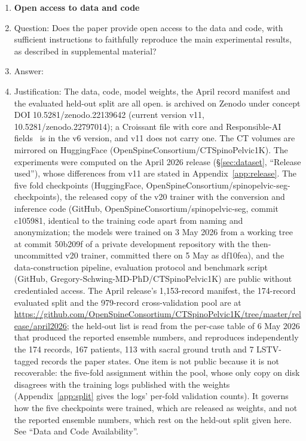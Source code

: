 \begin{enumerate}
\item {\bf Open access to data and code}
    \item[] Question: Does the paper provide open access to the data and code, with sufficient instructions to faithfully reproduce the main experimental results, as described in supplemental material?
    \item[] Answer: \answerYes{}
    \item[] Justification: The data, code, model weights, the April record manifest and the evaluated held-out split are all open. \dataset{} is archived on Zenodo under concept DOI 10.5281/zenodo.22139642 (current version v11, 10.5281/zenodo.22797014); a Croissant file with core and Responsible-AI fields~\citep{Akhtar2024Croissant:Datasets} is in the v6 version, and v11 does not carry one. The CT volumes are mirrored on HuggingFace (OpenSpineConsortium/CTSpinoPelvic1K). The experiments were computed on the April 2026 release (\S\ref{sec:dataset}, ``Release used''), whose differences from v11 are stated in Appendix~\ref{app:release}. The five fold checkpoints (HuggingFace, OpenSpineConsortium/spinopelvic-seg-checkpoints), the released copy of the v20 trainer with the conversion and inference code (GitHub, OpenSpineConsortium/spinopelvic-seg, commit c105981, identical to the training code apart from naming and anonymization; the models were trained on 3 May 2026 from a working tree at commit 50b209f of a private development repository with the then-uncommitted v20 trainer, committed there on 5 May as df10fea), and the data-construction pipeline, evaluation protocol and \TS{} benchmark script (GitHub, Gregory-Schwing-MD-PhD/CTSpinoPelvic1K) are public without credentialed access. The April release's 1{,}153-record manifest, the 174-record evaluated split and the 979-record cross-validation pool are at \url{https://github.com/OpenSpineConsortium/CTSpinoPelvic1K/tree/master/release/april2026}; the held-out list is read from the per-case table of 6 May 2026 that produced the reported ensemble numbers, and reproduces independently the 174 records, 167 patients, 113 with sacral ground truth and 7 LSTV-tagged records the paper states. One item is not public because it is not recoverable: the five-fold assignment within the pool, whose only copy on disk disagrees with the training logs published with the weights (Appendix~\ref{app:split} gives the logs' per-fold validation counts). It governs how the five checkpoints were trained, which are released as weights, and not the reported ensemble numbers, which rest on the held-out split given here. See ``Data and Code Availability''.

\end{enumerate}

